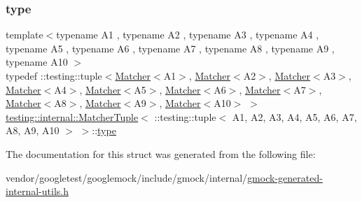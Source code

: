 \subsubsection{\texorpdfstring{type}{type}}
{\footnotesize\ttfamily template$<$typename A1 , typename A2 , typename A3 , typename A4 , typename A5 , typename A6 , typename A7 , typename A8 , typename A9 , typename A10 $>$ \\
typedef \+::testing\+::tuple$<$\hyperlink{classtesting_1_1_matcher}{Matcher}$<$A1$>$, \hyperlink{classtesting_1_1_matcher}{Matcher}$<$A2$>$, \hyperlink{classtesting_1_1_matcher}{Matcher}$<$A3$>$, \hyperlink{classtesting_1_1_matcher}{Matcher}$<$A4$>$, \hyperlink{classtesting_1_1_matcher}{Matcher}$<$A5$>$, \hyperlink{classtesting_1_1_matcher}{Matcher}$<$A6$>$, \hyperlink{classtesting_1_1_matcher}{Matcher}$<$A7$>$, \hyperlink{classtesting_1_1_matcher}{Matcher}$<$A8$>$, \hyperlink{classtesting_1_1_matcher}{Matcher}$<$A9$>$, \hyperlink{classtesting_1_1_matcher}{Matcher}$<$A10$>$ $>$ \hyperlink{structtesting_1_1internal_1_1_matcher_tuple}{testing\+::internal\+::\+Matcher\+Tuple}$<$ \+::testing\+::tuple$<$ A1, A2, A3, A4, A5, A6, A7, A8, A9, A10 $>$ $>$\+::\hyperlink{structtesting_1_1internal_1_1_matcher_tuple_3_01_1_1testing_1_1tuple_3_01_a1_00_01_a2_00_01_a3_0842d32b3c1d00aa4e42fe38fbc4fa689_ad8f6e383d160062fe6ccf40a839fdd31}{type}}



The documentation for this struct was generated from the following file\+:\begin{DoxyCompactItemize}
\item 
vendor/googletest/googlemock/include/gmock/internal/\hyperlink{gmock-generated-internal-utils_8h}{gmock-\/generated-\/internal-\/utils.\+h}\end{DoxyCompactItemize}
